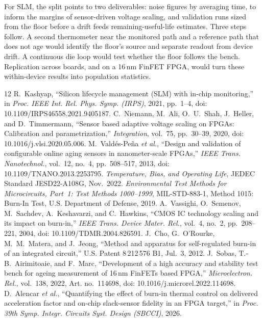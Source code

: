 \documentclass[10pt,twocolumn]{article}
\begin{document}
For SLM, the split points to two deliverables: noise figures by averaging time, to inform the margins of sensor-driven voltage scaling, and validation runs sized from the floor before a drift feeds remaining-useful-life estimates. Three steps follow. A second thermometer near the monitored path and a reference path that does not age would identify the floor's source and separate readout from device drift. A continuous die loop would test whether the floor follows the bench. Replication across boards, and on a 16\,nm FinFET FPGA, would turn these within-device results into population statistics.

\renewcommand{\refname}{References}\begin{thebibliography}{12}
\footnotesize
{} R.~Kashyap, ``Silicon lifecycle management (SLM) with in-chip monitoring,'' in \emph{Proc. IEEE Int. Rel. Phys. Symp. (IRPS)}, 2021, pp.~1--4, doi: 10.1109/IRPS46558.2021.9405187.
 C.~Niemann, M.~Ali, O.~U.~Shah, J.~Heller, and D.~Timmermann, ``Sensor based adaptive voltage scaling on FPGAs: Calibration and parametrization,'' \emph{Integration}, vol.~75, pp.~30--39, 2020, doi: 10.1016/j.vlsi.2020.05.006.
 M.~Vald\'es-Pe\~na \emph{et al.}, ``Design and validation of configurable online aging sensors in nanometer-scale FPGAs,'' \emph{IEEE Trans. Nanotechnol.}, vol.~12, no.~4, pp.~508--517, 2013, doi: 10.1109/TNANO.2013.2253795.
 \emph{Temperature, Bias, and Operating Life}, JEDEC Standard JESD22-A108G, Nov.~2022.
 \emph{Environmental Test Methods for Microcircuits, Part~1: Test Methods 1000--1999}, MIL-STD-883-1, Method 1015: Burn-In Test, U.S. Department of Defense, 2019.
 A.~Vassighi, O.~Semenov, M.~Sachdev, A.~Keshavarzi, and C.~Hawkins, ``CMOS IC technology scaling and its impact on burn-in,'' \emph{IEEE Trans. Device Mater. Rel.}, vol.~4, no.~2, pp.~208--221, 2004, doi: 10.1109/TDMR.2004.826591.
 J.~Cho, G.~O'Rourke, M.~M.~Matera, and J.~Jeong, ``Method and apparatus for self-regulated burn-in of an integrated circuit,'' U.S. Patent 8\,212\,576 B1, Jul.~3, 2012.
 J.~Sobas, T.-B.~Airimitoaie, and F.~Marc, ``Development of a high accuracy and stability test bench for ageing measurement of 16\,nm FinFETs based FPGA,'' \emph{Microelectron. Rel.}, vol.~138, 2022, Art. no.~114698, doi: 10.1016/j.microrel.2022.114698.
 D.~Alencar \emph{et al.}, ``Quantifying the effect of burn-in thermal control on delivered acceleration factor and on-chip slack-sensor fidelity in an FPGA target,'' in \emph{Proc. 39th Symp. Integr. Circuits Syst. Design (SBCCI)}, 2026.

\end{thebibliography}
\end{document}
